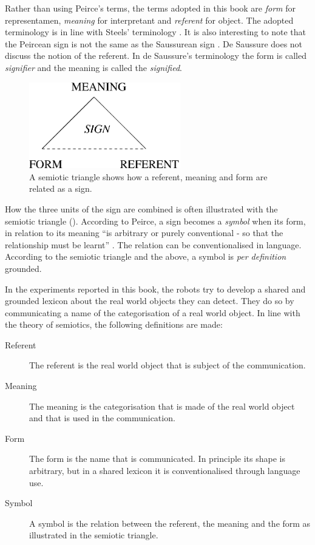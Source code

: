 

Rather than using Peirce's terms, the terms adopted in this book are {\em form} for representamen, {\em meaning} for interpretant and {\em referent} for object. The adopted terminology is in line with Steels' terminology \citep{steels:2000}. It is also interesting to note that the Peircean sign is not the same as the Saussurean sign \citep{saussure:1974}. De Saussure does not discuss the notion of the referent. In de Saussure's terminology the form is called {\em signifier} and the meaning is called the {\em signified}.


\begin{figure}
\centerline{\includegraphics[width=6.6cm]{introduction/semiotic3.eps}}
\caption{A semiotic triangle shows how a referent, meaning and form are related as a sign.}
\label{f:intro:semiotic}
\end{figure}

How the three units of the sign are combined is often illustrated with the semiotic triangle (). According to Peirce, a sign becomes a {\em symbol} when its form, in relation to its meaning ``is arbitrary or purely conventional - so that the relationship must be learnt'' \citep{chandler:1994}. The relation can be conventionalised in language. According to the semiotic triangle and the above, a symbol is {\em per definition} grounded.

In the experiments reported in this book, the robots try to develop a shared and grounded lexicon about the real world objects they can detect. They do so by communicating a name of the categorisation of a real world object. In line with the theory of semiotics, the following definitions are made:

\begin{description}

\item[Referent] The referent is the real world object that is subject of the communication.

\item[Meaning] The meaning is the categorisation that is made of the real world object and that is used in the communication.

\item[Form] The form is the name that is communicated. In principle its shape is arbitrary, but in a shared lexicon it is conventionalised through language use.

\item[Symbol] A symbol is the relation between the referent, the meaning and the form as illustrated in the semiotic triangle.

\end{description}


